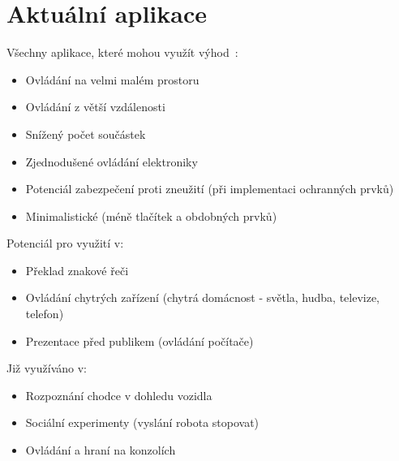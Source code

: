\section{Aktuální aplikace}
Všechny aplikace, které mohou využít výhod~\cite{14}:
\begin{itemize}
\item Ovládání na velmi malém prostoru
\item Ovládání z větší vzdálenosti
\item Snížený počet součástek
\item Zjednodušené ovládání elektroniky
\item Potenciál zabezpečení proti zneužití (při implementaci ochranných prvků)
\item Minimalistické (méně tlačítek a obdobných prvků)\\
\end{itemize}
Potenciál pro využití v:
\begin{itemize}
\item Překlad znakové řeči
\item Ovládání chytrých zařízení (chytrá domácnost - světla, hudba, televize, telefon)
\item Prezentace před publikem (ovládání počítače)
\\
\end{itemize}
Již využíváno v:
\begin{itemize}
\item Rozpoznání chodce v dohledu vozidla
\item Sociální experimenty (vyslání robota stopovat)
\item Ovládání a hraní na konzolích
\end{itemize}



\endinput
